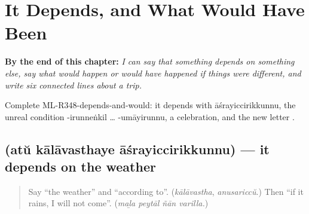 
\chapter{It Depends, and What Would Have Been}
\label{ch:ml-it-depends-and-what-would-have-been}

\begin{chapteropening}
\textbf{By the end of this chapter:} \emph{I can say that something depends on something else, say what would happen or would have happened if things were different, and write six connected lines about a trip.}

Complete ML-R348-depends-and-would: it depends with āśrayiccirikkunnu, the unreal condition -irunneṅkil … -umāyirunnu, a celebration, and the new letter .
\end{chapteropening}

\section[\texorpdfstring{\ml{അത്} \ml{കാലാവസ്ഥയെ} … (atŭ kālāvasthaye …)}{അത് കാലാവസ്ഥയെ … (atŭ kālāvasthaye …)}]{   (atŭ kālāvasthaye āśrayiccirikkunnu) — it depends on the weather}

\label{lesson:ML-C348-asrayiccirikkunnu}



\begin{quote}
Say \textquotedblleft{}the weather\textquotedblright{} and \textquotedblleft{}according to\textquotedblright{}. (\emph{kālāvastha}, \emph{anusariccŭ}.) Then \textquotedblleft{}if it rains, I will not come\textquotedblright{}. (\emph{maḻa peytāl ñān varilla.})
\end{quote}

